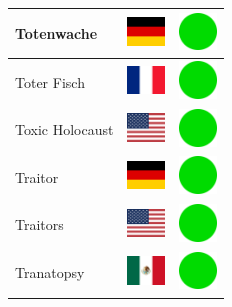 \documentclass[12pt, a4paper, twoside]{report}
\begin{document}
\begin{center}
\begin{longtable}{|p{5cm}|p{2cm}|p{2cm}|}
 Totenwache                                                 & \includegraphics[width=1cm]{../img/flags/de} &   \includegraphics[width=1cm]{../likes/y} \\ \hline
 Toter Fisch                                                & \includegraphics[width=1cm]{../img/flags/fr} &   \includegraphics[width=1cm]{../likes/y} \\ \hline
 Toxic Holocaust                                            & \includegraphics[width=1cm]{../img/flags/us} &   \includegraphics[width=1cm]{../likes/y} \\ \hline
 Traitor                                                    & \includegraphics[width=1cm]{../img/flags/de} &   \includegraphics[width=1cm]{../likes/y} \\ \hline
 Traitors                                                   & \includegraphics[width=1cm]{../img/flags/us} &   \includegraphics[width=1cm]{../likes/y} \\ \hline
 Tranatopsy                                                 & \includegraphics[width=1cm]{../img/flags/mx} &   \includegraphics[width=1cm]{../likes/y} \\ \hline

\end{longtable}
\end{center}
\end{document}
